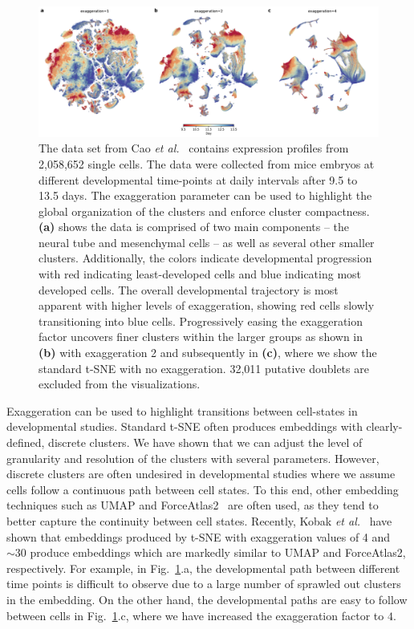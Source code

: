\documentclass[twocolumn]{bmcart}
\begin{document}
\begin{figure}[htbp]
  \includegraphics[width=\textwidth]{cao2019}
  \caption{\label{fig:cao}The data set from Cao \textit{et al.}~\cite{cao2019single} contains expression profiles from 2,058,652 single cells. The data were collected from mice embryos at different developmental time-points at daily intervals after 9.5 to 13.5 days. The exaggeration parameter can be used to highlight the global organization of the clusters and enforce cluster compactness. \textbf{(a)} shows the data is comprised of two main components -- the neural tube and mesenchymal cells -- as well as several other smaller clusters. Additionally, the colors indicate developmental progression with red indicating least-developed cells and blue indicating most developed cells. The overall developmental trajectory is most apparent with higher levels of exaggeration, showing red cells slowly transitioning into blue cells. Progressively easing the exaggeration factor uncovers finer clusters within the larger groups as shown in \textbf{(b)} with exaggeration 2 and subsequently in \textbf{(c)}, where we show the standard t-SNE with no exaggeration. 32,011 putative doublets are excluded from the visualizations.}
\end{figure}

Exaggeration can be used to highlight transitions between cell-states in developmental studies. Standard t-SNE often produces embeddings with clearly-defined, discrete clusters. We have shown that we can adjust the level of granularity and resolution of the clusters with several parameters. However, discrete clusters are often undesired in developmental studies where we assume cells follow a continuous path between cell states. To this end, other embedding techniques such as UMAP and ForceAtlas2~\cite{jacomy2014forceatlas2} are often used, as they tend to better capture the continuity between cell states. Recently, Kobak \textit{et al.}~\cite{TODO} have shown that embeddings produced by t-SNE with exaggeration values of 4 and $\sim30$ produce embeddings which are markedly similar to UMAP and ForceAtlas2, respectively. For example, in Fig.~\ref{fig:cao}.a, the developmental path between different time points is difficult to observe due to a large number of sprawled out clusters in the embedding. On the other hand, the developmental paths are easy to follow between cells in Fig.~\ref{fig:cao}.c, where we have increased the exaggeration factor to $4$.
\end{document}
